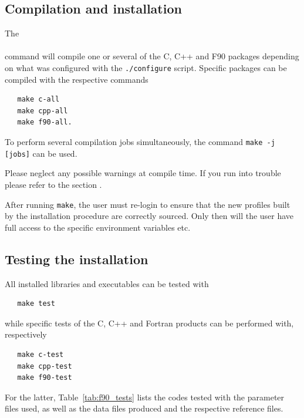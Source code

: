 \documentclass[12pt,twoside]{article}
\begin{document}
\subsection{Compilation and installation}

The \\
 \\
command will compile one or several of the C, C++ and F90 packages
depending on what was configured with the {\tt ./configure} script.
Specific packages can be compiled with the respective commands 
\begin{verbatim}
   make c-all
   make cpp-all
   make f90-all.
\end{verbatim}

To perform several compilation jobs simultaneously, the command {\tt make -j [jobs]}
can be used.

Please neglect any possible warnings at compile time. If you run into
trouble please refer to the section .

After running {\tt make}, the user must re-login to ensure that the new profiles built by the installation
procedure are correctly sourced. Only then will the
user have full access to the specific \healpix
environment variables etc.

\subsection{Testing the installation}

All installed libraries and executables can be tested with 
\begin{verbatim}
   make test
\end{verbatim}

while specific tests of the C, C++ and Fortran products can be performed with,
respectively
\begin{verbatim}
   make c-test
   make cpp-test
   make f90-test
\end{verbatim}
For the latter, Table~\ref{tab:f90_tests} lists the codes tested with the
parameter files used, as well as the data files produced and the respective
reference files.
\end{document}
